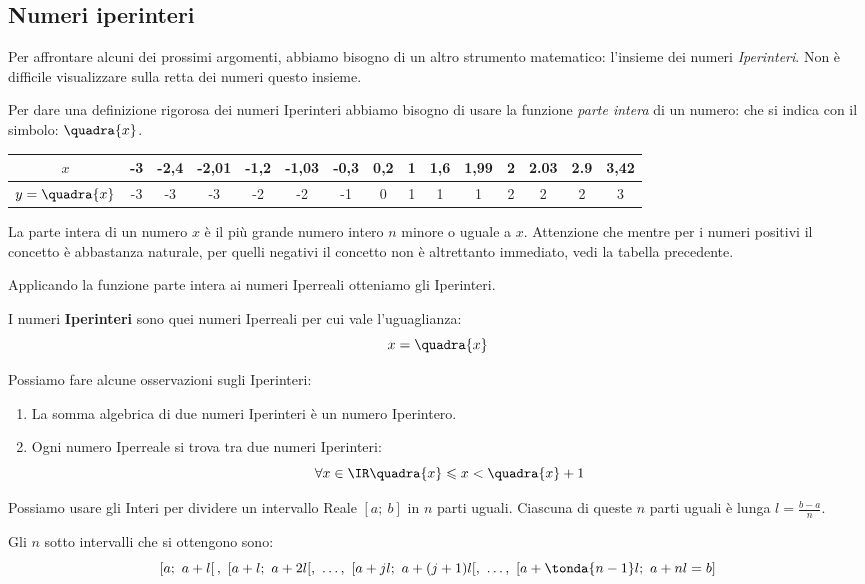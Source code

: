\subsection{Numeri iperinteri}
\label{subsec:cont_iperinteri}

Per affrontare alcuni dei prossimi argomenti, abbiamo bisogno di un altro 
strumento matematico: l'insieme dei numeri \emph{Iperinteri}.
Non è difficile visualizzare sulla retta dei numeri questo insieme.

Per dare una definizione rigorosa dei numeri Iperinteri abbiamo bisogno di 
usare la funzione \emph{parte intera} di un numero: che si indica con il 
simbolo:
\(\quadra{x}\).
\begin{center}
\begin{tabular}{ccccccccccccccc}
\(x\) & 
-3&-2,4&-2,01&-1,2&-1,03&-0,3&0,2&1&1,6&1,99&2&2.03&2.9&3,42\\
\hline
\(y=\quadra{x}\) & 
-3&-3  &-3   &-2  &-2   &-1  &0  &1&1  &1   &2&2   &2  &3
\end{tabular}
\end{center}

La parte intera di un numero \(x\) è il più grande numero intero \(n\) 
minore o uguale a \(x\). Attenzione che mentre per i numeri positivi il 
concetto è abbastanza naturale, per quelli negativi il concetto non è 
altrettanto immediato, vedi la tabella precedente.

Applicando la funzione parte intera ai numeri Iperreali otteniamo gli 
Iperinteri.

\begin{definizione}
 I numeri \textbf{Iperinteri} sono quei numeri Iperreali per cui vale 
l'uguaglianza:
 \[x=\quadra{x}\]
\end{definizione}

Possiamo fare alcune osservazioni sugli Iperinteri:

\begin{enumerate}
 \item 
La somma algebrica di due numeri Iperinteri è un numero Iperintero.
 \item 
Ogni numero Iperreale si trova tra due numeri Iperinteri:
\[\forall x \in \IR \quadra{x} \leqslant x < \quadra{x}+1\]
\end{enumerate}

Possiamo usare gli Interi per dividere un intervallo Reale \([a;~b]\)
in \(n\) parti uguali. Ciascuna di queste \(n\) parti 
uguali è lunga \(l=\frac{b-a}{n}\).

Gli \(n\) sotto intervalli che si ottengono sono:
\[\left[a;~a+l \right[,~[a+l;~a+2l[,~\dots,~
[a+jl;~a+(j+1)l[,~\dots,~
[a+\tonda{n-1}l;~a+nl=b]\]

